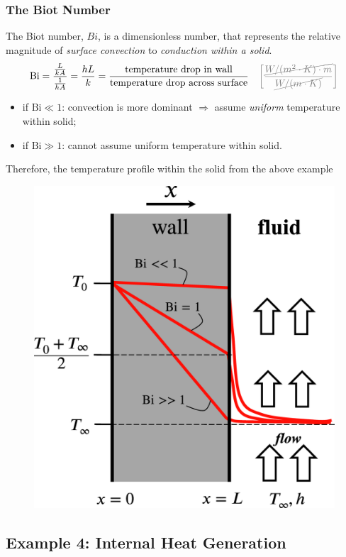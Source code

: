 \documentclass[12pt, a4paper]{article}
\numberwithin{equation}{subsection}
\newcommand{\Bi}{\mathrm{Bi}}
\begin{document}
\subsubsection{The Biot Number}
The Biot number, $Bi$, is a dimensionless number, that represents the relative magnitude of \textit{surface convection} to \textit{conduction within a solid}.
\[ 
    \Bi = \frac{\frac{L}{kA}}{\frac{1}{hA}} = \frac{hL}{k} = \frac{\text{temperature drop in wall}}{\text{temperature drop across surface}}   \quad \mathrm{{\color{gray} \bigg[ \frac{ \cancel{W/(m^2\cdot K) \cdot m}}{\cancel{W/(m\cdot K)}}\bigg]}}
\]
\begin{itemize}
    \item if $\Bi \ll 1$: convection is more dominant $\Rightarrow$ assume \textit{uniform} temperature within solid;
    \item if $\Bi \gg 1$: cannot assume uniform temperature within solid.
\end{itemize}
Therefore, the temperature profile within the solid from the above example
\begin{figure}[H]
    \centering
    \includegraphics[width=.4\textwidth]{img/conduction_convection_solution.eps}
\end{figure}

\subsection{Example 4: Internal Heat Generation}
\end{document}
